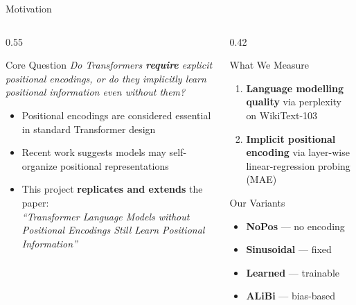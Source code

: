 \documentclass[aspectratio=169, 10pt]{beamer}
\begin{document}
\begin{frame}{Motivation}
  \begin{columns}[T]
    \begin{column}{0.55\textwidth}
      \begin{block}{Core Question}
        \textit{Do Transformers \textbf{require} explicit positional encodings, or do they
        implicitly learn positional information even without them?}
      \end{block}
      \vspace{0.5em}
      \begin{itemize}
        \item Positional encodings are considered \alert{essential} in standard Transformer design
        \item Recent work suggests models may self-organize positional representations
        \item This project \textbf{replicates and extends} the paper:\\
              \textit{``Transformer Language Models without Positional Encodings
              Still Learn Positional Information''}
      \end{itemize}
    \end{column}
    \begin{column}{0.42\textwidth}
      \begin{alertblock}{What We Measure}
        \begin{enumerate}
          \item \textbf{Language modelling quality} via perplexity on WikiText-103
          \item \textbf{Implicit positional encoding} via layer-wise linear-regression probing (MAE)
        \end{enumerate}
      \end{alertblock}
      \vspace{0.5em}
      \begin{block}{Our Variants}
        \begin{itemize}
          \item \textbf{NoPos} — no encoding
          \item \textbf{Sinusoidal} — fixed
          \item \textbf{Learned} — trainable
          \item \textbf{ALiBi} — bias-based
        \end{itemize}
      \end{block}
    \end{column}
  \end{columns}
\end{frame}
\end{document}

